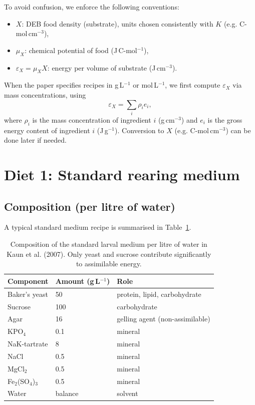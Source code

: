 \documentclass[11pt]{article}
\begin{document}
To avoid confusion, we enforce the following conventions:
\begin{itemize}
  \item $X$: DEB food density (substrate), units chosen consistently with $K$ (e.g. C-mol\,cm$^{-3}$),
  \item $\mu_X$: chemical potential of food (J\,C-mol$^{-1}$),
  \item $\varepsilon_X = \mu_X X$: energy per volume of substrate (J\,cm$^{-3}$).
\end{itemize}

When the paper specifies recipes in g\,L$^{-1}$ or mol\,L$^{-1}$, we first compute $\varepsilon_X$ via mass concentrations, using
\begin{equation}
  \varepsilon_X = \sum_i \rho_i e_i,
\end{equation}
where $\rho_i$ is the mass concentration of ingredient $i$ (g\,cm$^{-3}$) and $e_i$ is the gross energy content of ingredient $i$ (J\,g$^{-1}$). Conversion to $X$ (e.g. C-mol\,cm$^{-3}$) can be done later if needed.

\section{Diet 1: Standard rearing medium}

\subsection{Composition (per litre of water)}

A typical standard medium recipe is summarised in Table~\ref{tab:standard-composition}.

\begin{table}[h]
\centering
\begin{tabular}{lll}
\toprule
Component & Amount (g\,L$^{-1}$) & Role \\
\midrule
Baker's yeast & 50 & protein, lipid, carbohydrate \\
Sucrose & 100 & carbohydrate \\
Agar & 16 & gelling agent (non-assimilable) \\
KPO$_4$ & 0.1 & mineral \\
NaK-tartrate & 8 & mineral \\
NaCl & 0.5 & mineral \\
MgCl$_2$ & 0.5 & mineral \\
Fe$_2$(SO$_4$)$_3$ & 0.5 & mineral \\
Water & balance & solvent \\
\bottomrule
\end{tabular}
\caption{Composition of the standard larval medium per litre of water in Kaun et al. (2007). Only yeast and sucrose contribute significantly to assimilable energy.}
\label{tab:standard-composition}
\end{table}
\end{document}
